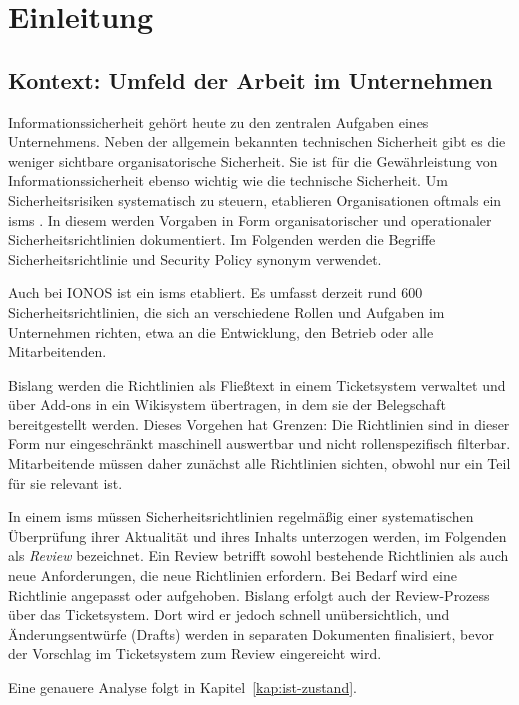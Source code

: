 \chapter{Einleitung}

\section{Kontext: Umfeld der Arbeit im Unternehmen}

Informationssicherheit gehört heute zu den zentralen Aufgaben eines Unternehmens.
Neben der allgemein bekannten technischen Sicherheit gibt es die weniger sichtbare organisatorische Sicherheit.
Sie ist für die Gewährleistung von Informationssicherheit ebenso wichtig wie die technische Sicherheit.
Um Sicherheitsrisiken systematisch zu steuern, etablieren Organisationen oftmals ein \ac{isms} \cite{TODO-ISO27001}.
In diesem werden Vorgaben in Form organisatorischer und operationaler Sicherheitsrichtlinien dokumentiert.
Im Folgenden werden die Begriffe Sicherheitsrichtlinie und Security Policy synonym verwendet.

Auch bei IONOS ist ein \acs{isms} etabliert.
Es umfasst derzeit rund 600 Sicherheitsrichtlinien, die sich an verschiedene Rollen und Aufgaben im Unternehmen richten, etwa an die Entwicklung, den Betrieb oder alle Mitarbeitenden.

Bislang werden die Richtlinien als Fließtext in einem Ticketsystem verwaltet und über Add-ons in ein Wikisystem übertragen, in dem sie der Belegschaft bereitgestellt werden.
Dieses Vorgehen hat Grenzen: Die Richtlinien sind in dieser Form nur eingeschränkt maschinell auswertbar und nicht rollenspezifisch filterbar.
Mitarbeitende müssen daher zunächst alle Richtlinien sichten, obwohl nur ein Teil für sie relevant ist.

In einem \ac{isms} müssen Sicherheitsrichtlinien regelmäßig einer systematischen Überprüfung ihrer Aktualität und ihres Inhalts unterzogen werden, im Folgenden als \emph{Review} bezeichnet.
Ein Review betrifft sowohl bestehende Richtlinien als auch neue Anforderungen, die neue Richtlinien erfordern.
Bei Bedarf wird eine Richtlinie angepasst oder aufgehoben.
Bislang erfolgt auch der Review-Prozess über das Ticketsystem.
Dort wird er jedoch schnell unübersichtlich, und Änderungsentwürfe (Drafts) werden in separaten Dokumenten finalisiert, bevor der Vorschlag im Ticketsystem zum Review eingereicht wird.

Eine genauere Analyse folgt in Kapitel~\ref{kap:ist-zustand}.

